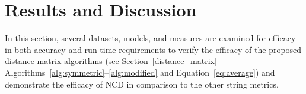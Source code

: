 \documentclass[preprint,12pt]{article}
\begin{document}









\section{Results and Discussion}
\label{results}

In this section, several datasets, models, and measures are examined for efficacy in both accuracy and run-time requirements to verify the efficacy of the proposed distance matrix algorithms (see Section~\ref{distance_matrix} Algorithms~\ref{alg:symmetric}--\ref{alg:modified} and Equation~\ref{eq:average}) and demonstrate the efficacy of NCD in comparison to the other string metrics.
\end{document}
